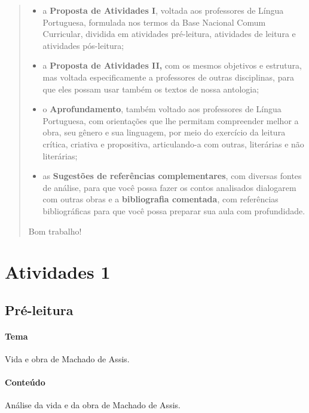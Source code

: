 \documentclass{extarticle}
\begin{document}
\begin{abstract}
\begin{itemize}
\item
  a \textbf{Proposta de Atividades I}, voltada aos professores de Língua
  Portuguesa, formulada nos termos da Base Nacional Comum Curricular,
  dividida em atividades pré-leitura, atividades de leitura e atividades
  pós-leitura;
\item
  a \textbf{Proposta de Atividades II,} com os mesmos objetivos e
  estrutura, mas voltada especificamente a professores de outras
  disciplinas, para que eles possam usar também os textos de nossa
  antologia;
\item
  o \textbf{Aprofundamento}, também voltado aos professores de Língua
  Portuguesa, com orientações que lhe permitam compreender melhor a
  obra, seu gênero e sua linguagem, por meio do exercício da leitura
  crítica, criativa e propositiva, articulando-a com outras, literárias
  e não literárias;
\item
  as \textbf{Sugestões de referências complementares}, com diversas
  fontes de análise, para que você possa fazer os contos analisados
  dialogarem com outras obras e a \textbf{bibliografia comentada}, com
  referências bibliográficas para que você possa preparar sua aula com
  profundidade.
\end{itemize}

Bom trabalho!

\end{abstract}

\tableofcontents


\section{Atividades 1}


\subsection{Pré-leitura}

%

\paragraph{Tema} Vida e obra de Machado de Assis.

\paragraph{Conteúdo} Análise da vida e da obra de Machado de Assis.
\end{document}
